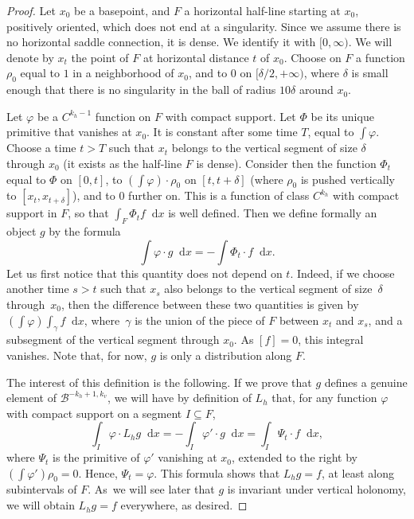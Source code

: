 \documentclass[JEP,XML,SOM,Unicode]{cedram}
\newcommand{\boB}{\mathcal{B}}
\newcommand{\dd}{\mathop{}\!\mathrm{d}}
\let\phi\varphi
\theoremstyle{definition}
\numberwithin{equation}{section}
\begin{document}
\begin{proof}
Let $x_0$ be a basepoint, and $F$ a horizontal half-line starting at $x_0$,
positively oriented, which does not end at a singularity. Since we assume
there is no horizontal saddle connection, it is dense. We identify it with
$[0,\infty)$. We will denote by $x_t$ the point of $F$ at horizontal distance
$t$ of $x_0$. Choose on $F$ a function $\rho_0$ equal to $1$ in a
neighborhood of $x_0$, and to $0$ on $[\delta/2, +\infty)$, where $\delta$ is
small enough that there is no singularity in the ball of radius $10\delta$
around $x_0$.

Let $\phi$ be a $C^{k_h-1}$ function on $F$ with compact support. Let $\Phi$
be its unique primitive that vanishes at $x_0$. It is constant after some
time $T$, equal to $\int \phi$. Choose a time $t>T$ such that $x_t$ belongs
to the vertical segment of size $\delta$ through $x_0$ (it exists as the
half-line $F$ is dense). Consider then the function $\Phi_t$ equal to $\Phi$
on $[0, t]$, to $(\int \phi) \cdot \rho_0$ on $[t, t+\delta]$ (where $\rho_0$
is pushed vertically to $[x_t, x_{t+\delta}]$), and to $0$ further on. This
is a function of class $C^{k_h}$ with compact support in $F$, so that $\int_F
\Phi_t f \dd x$ is well defined. Then we define formally an object $g$ by the
formula
\begin{equation}
\label{eq:ipwuxcviopuw}
\int \phi\cdot g \dd x = -\int \Phi_t \cdot f \dd x.
\end{equation}
Let us first notice that this quantity does not depend on $t$. Indeed, if we
choose another time $s>t$ such that $x_s$ also belongs to the vertical
segment of size~$\delta$ through~$x_0$, then the difference between these two
quantities is given by $(\int \phi) \int_\gamma f \dd x$, where~$\gamma$ is
the union of the piece of $F$ between $x_t$ and $x_s$, and a subsegment of
the vertical segment through $x_0$. As $[f] = 0$, this integral vanishes.
Note that, for now, $g$ is only a distribution along $F$.

The interest of this definition is the following. If we prove that $g$
defines a genuine element of $\boB^{-k_h+1, k_v}$, we will have by definition
of $L_h$ that, for any function $\phi$ with compact support on a segment $I
\subseteq F$,
\begin{equation*}
\int_I \phi \cdot L_h g \dd x = -\int_I \phi' \cdot g \dd x
=\int_I \Psi_t \cdot f \dd x,
\end{equation*}
where $\Psi_t$ is the primitive of $\phi'$ vanishing at $x_0$, extended to
the right by $(\int\phi') \rho_0 = 0$. Hence, $\Psi_t = \phi$. This formula
shows that $L_h g = f$, at least along subintervals of $F$. As~we will see
later that $g$ is invariant under vertical holonomy, we will obtain $L_h g =
f$ everywhere, as desired.


\end{proof}
\end{document}
